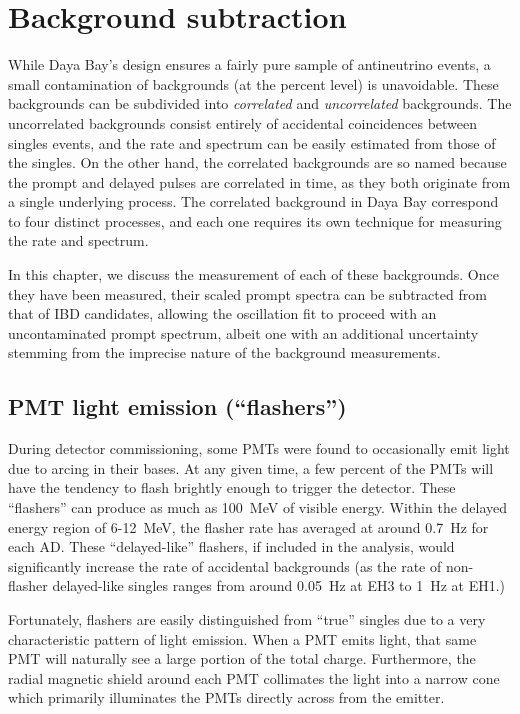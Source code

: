 \documentclass[../thesis.tex]{subfiles}
\begin{document}
\chapter{Background subtraction}
\label{chap:bkg}

While Daya Bay's design ensures a fairly pure sample of antineutrino events, a
small contamination of backgrounds (at the percent level) is unavoidable. These
backgrounds can be subdivided into \emph{correlated} and \emph{uncorrelated}
backgrounds. The uncorrelated backgrounds consist entirely of accidental
coincidences between singles events, and the rate and spectrum can be easily
estimated from those of the singles. On the other hand, the correlated
backgrounds are so named because the prompt and delayed pulses are correlated in
time, as they both originate from a single underlying process. The correlated
background in Daya Bay correspond to four distinct processes, and each one
requires its own technique for measuring the rate and spectrum.

In this chapter, we discuss the measurement of each of these backgrounds. Once
they have been measured, their scaled prompt spectra can be subtracted from that
of IBD candidates, allowing the oscillation fit to proceed with an
uncontaminated prompt spectrum, albeit one with an additional uncertainty
stemming from the imprecise nature of the background measurements.

\section{PMT light emission (``flashers'')}
\label{sec:bkgFlashers}

During detector commissioning, some PMTs were found to occasionally emit light
due to arcing in their bases. At any given time, a few percent of the PMTs will
have the tendency to flash brightly enough to trigger the detector. These
``flashers'' can produce as much as 100~MeV of visible energy. Within the
delayed energy region of 6-12~MeV, the flasher rate has averaged at around
0.7~Hz for each AD. These ``delayed-like'' flashers, if included in the
analysis, would significantly increase the rate of accidental backgrounds (as
the rate of non-flasher delayed-like singles ranges from around 0.05~Hz at EH3
to 1~Hz at EH1.)

Fortunately, flashers are easily distinguished from ``true'' singles due to a
very characteristic pattern of light emission. When a PMT emits light, that same
PMT will naturally see a large portion of the total charge. Furthermore, the
radial magnetic shield around each PMT collimates the light into a narrow cone
which primarily illuminates the PMTs directly across from the emitter.
\end{document}
